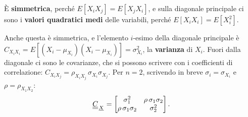 
È \textbf{simmetrica}, perché $E[X_i X_j] = E[X_j X_i]$, e sulla diagonale principale ci sono i \textbf{valori quadratici
medi} delle variabili, perché $E[X_i X_i] = E[X_i^2]$.


Anche questa è simmetrica, e l'elemento $i$-esimo della diagonale principale è
$C_{X_i X_i} = E[(X_i - \mu_{X_i})(X_i - \mu_{X_i})] = \sigma_{X_i}^2$, la \textbf{varianza} di $X_i$. Fuori dalla
diagonale ci sono le covarianze, che si possono scrivere con i coefficienti di correlazione:
$C_{X_i X_j} = \rho_{X_i X_j}\, \sigma_{X_i} \sigma_{X_j}$. Per $n = 2$, scrivendo in breve $\sigma_i = \sigma_{X_i}$ e
$\rho = \rho_{X_1 X_2}$:
\[ {\mkern1mu\underline{\underline{C}}\mkern1mu}_{{\mkern1mu\underline{X}\mkern1mu}} = \begin{bmatrix} \sigma_1^2 & \rho\, \sigma_1 \sigma_2 \\ \rho\, \sigma_1 \sigma_2 & \sigma_2^2
   \end{bmatrix} . \]


